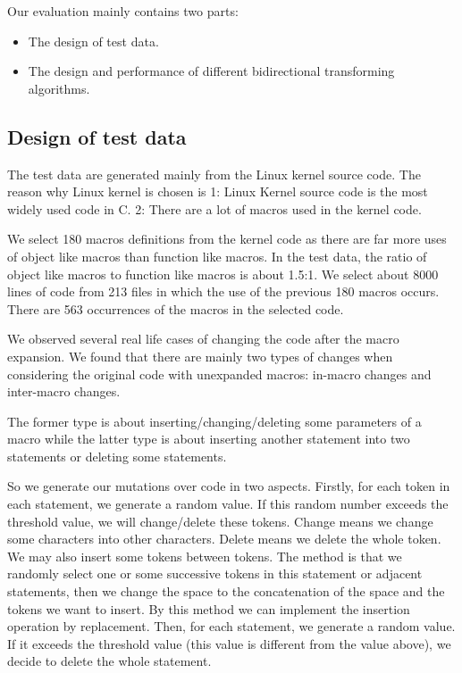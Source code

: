 Our evaluation mainly contains two parts:
\begin{itemize}
\item The design of test data.
\item The design and performance of different bidirectional transforming algorithms.
\end{itemize}

\subsection{Design of test data}

The test data are generated mainly from the Linux kernel source code.
The reason why Linux kernel is chosen is
1: Linux Kernel source code is the most widely used code in C.
2: There are a lot of macros used in the kernel code.

We select 180 macros definitions from the kernel code as there are far more uses of object like macros than function like macros. In the test data, the ratio of object like macros to function like macros is about 1.5:1.
We select about 8000 lines of code from 213 files in which the use of the previous 180 macros occurs. There are 563 occurrences of the macros in the selected code.

We observed several real life cases of changing the code after the macro expansion. We found that there are mainly two types of changes when considering the original code with unexpanded macros: in-macro changes and inter-macro changes.

The former type is about inserting/changing/deleting some parameters of a macro while the latter type is about inserting another statement into two statements or deleting some statements.

So we generate our mutations over code in two aspects.
Firstly, for each token in each statement, we generate a random value. If this random number exceeds the threshold value, we will change/delete these tokens. Change means we change some characters into other characters. Delete means we delete the whole token. We may also insert some tokens between tokens. The method is that we randomly select one or some successive tokens in this statement or adjacent statements, then we change the space to the concatenation of the space and the tokens we want to insert. By this method we can implement the insertion operation by replacement.
Then, for each statement, we generate a random value. If it exceeds the threshold value (this value is different from the value above), we decide to delete the whole statement.

